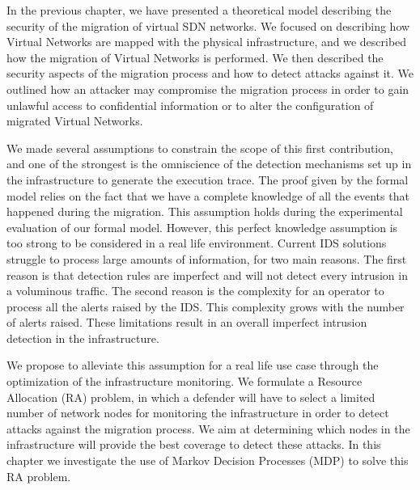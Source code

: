 In the previous chapter, we have presented a theoretical model describing the security of the migration of virtual SDN networks. We focused on describing how Virtual Networks are mapped with the physical infrastructure, and we described how the migration of Virtual Networks is performed. We then described the security aspects of the migration process and how to detect attacks against it. We outlined how an attacker may compromise the migration process in order to gain unlawful access to confidential information or to alter the configuration of migrated Virtual Networks.

We made several assumptions to constrain the scope of this first contribution, and one of the strongest is the omniscience of the detection mechanisms set up in the infrastructure to generate the execution trace. The proof given by the formal model relies on the fact that we have a complete knowledge of all the events that happened during the migration. This assumption holds during the experimental evaluation of our formal model. 
However, this perfect knowledge assumption is too strong to be considered in a real life environment.
Current IDS solutions struggle to process large amounts of information, for two main reasons. The first reason is that detection rules are imperfect and will not detect every intrusion in a voluminous traffic. The second reason is the complexity for an operator to process all the alerts raised by the IDS. This complexity grows with the number of alerts raised. These limitations result in an overall imperfect intrusion detection in the infrastructure. 

We propose to alleviate this assumption for a real life use case through the optimization of the infrastructure monitoring. We formulate a Resource Allocation (RA) problem, in which a defender will have to select a limited number of network nodes for monitoring the infrastructure in order to detect attacks against the migration process. We aim at determining which nodes in the infrastructure will provide the best coverage to detect these attacks. 
In this chapter we investigate the use of Markov Decision Processes (MDP) to solve this RA problem.


